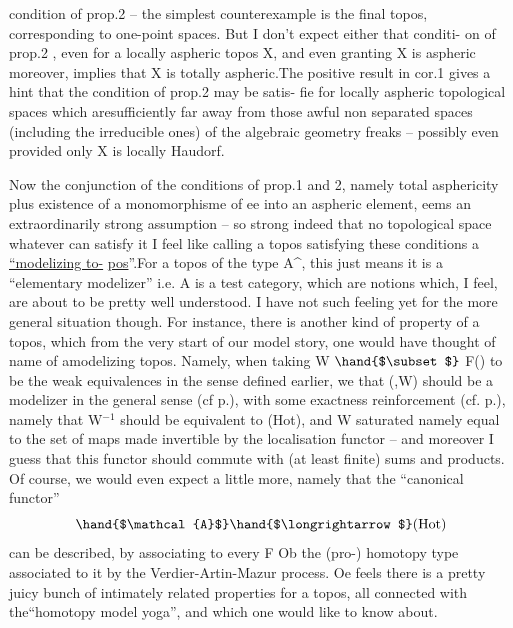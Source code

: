 condition of prop.2 -- the simplest counterexample is the final topos,
corresponding to one-point spaces. But I don't expect either that conditi-%
on of prop.2 , even for a locally aspheric topos X, and even granting
X is aspheric moreover, implies that X is totally aspheric.The positive 
result in cor.1 gives a hint that the condition of prop.2 may be satis-%
fie for locally aspheric topological spaces which aresufficiently far
away from those awful non separated spaces (including the irreducible ones)
of the algebraic geometry freaks -- possibly even  provided only
X is locally Haudorf.

 Now the conjunction of the conditions of prop.1 and 2,  namely
total asphericity plus \hand{\unsure{*}}existence of  a monomorphisme of
e\hand{$\amalg$}e into an aspheric element, eems an extraordinarily strong assumption
-- so strong indeed that no topological space whatever can satisfy it\hand{!}
I feel like calling a topos satisfying these conditions a \uline{``modelizing to-}%
\uline{pos}''.For a topos of the type A\^{}, this just means it is a ``elementary 
modelizer'' i.e. A is a test category, which are notions which, I feel, are
about to be pretty well understood. I have not such feeling yet for the
more general situation though. For instance, there is another kind of
property of a topos, which from the very start of our model story, one
would have thought of  name of amodelizing topos. Namely, when
taking W $\hand{$\subset$}$ F() to be the weak equivalences in the sense defined earlier,
we  that  (,W) should be a modelizer in the general sense
(cf p.), with some exactness reinforcement (cf. p.), namely that
W$^{-1}$ should be equivalent to (Hot), and W saturated namely equal to the
set of maps made invertible by the localisation functor -- and moreover
I guess that this functor should commute with (at least finite) sums and
products. Of course, we would even expect a little more, namely that
the ``canonical functor''
\[ \hand{$\mathcal{A}$} \hand{$\longrightarrow$} (\mathrm{Hot}) \]
can be described, by associating to every F \hand{$\in$} Ob the (pro-) homotopy
type associated to it by the Verdier-Artin-Mazur process. Oe feels
there is a pretty juicy bunch of intimately related properties for a topos,
all connected with the``homotopy model yoga'', and which one would like to
know about.

